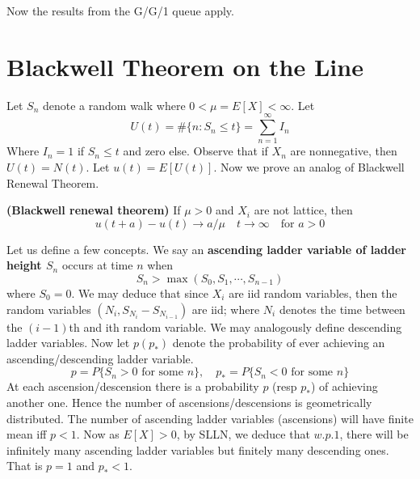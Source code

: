 \documentclass[a4paper,10pt,english]{article}
\begin{document}
Now the results from the G/G/1 queue apply.

\section{Blackwell Theorem on the Line}
Let $S_n$ denote a random walk where $0<\mu=E[X] < \infty$. Let 
\[U(t)=\#\{n: S_n \leq t\} = \sum_{n=1}^\infty I_n\]
Where $I_n=1$ if $S_n \leq t$ and zero else. Observe that if $X_n$ are nonnegative, then $U(t) = N(t)$. Let $u(t) = E[U(t)]$. Now we prove an analog of Blackwell Renewal Theorem. 

\begin{thm}
\textbf{(Blackwell renewal theorem)} If $\mu > 0$ and $X_i$ are not lattice, then
\[u(t+a) - u(t) \to a/\mu \quad t\to \infty \quad \mbox{for }a>0\]
\end{thm}
Let us define a few concepts. We say an \textbf{ascending ladder variable of ladder height $S_n$} occurs at time $n$ when
\[S_n > \max(S_0,S_1,\cdots, S_{n-1})\]
where $S_0 = 0$. We may deduce that since $X_i$ are iid random variables, then the random variables $(N_i,S_{N_i}-S_{N_{i-1}})$ are iid; where $N_i$ denotes the time between the $(i-1)$th and ith random variable. We may analogously define descending ladder variables. Now let $p(p_*)$ denote the probability of ever achieving an ascending/descending ladder variable.
\[p = P\{S_n > 0 \mbox{ for some }n\},\quad p_* = P\{S_n < 0 \mbox{ for some }n\}\]
At each ascension/descension there is a probability $p$ (resp $p_*$) of achieving another one. Hence the number of ascensions/descensions is geometrically distributed. The number of ascending ladder variables (ascensions) will have finite mean iff $p < 1$. Now as $E[X] > 0$, by SLLN, we deduce that $w.p.1$, there will be infinitely many ascending ladder variables but finitely many descending ones. That is $p =1$ and $p_* < 1$.
\end{document}
